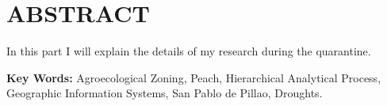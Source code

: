 \chapter*{ABSTRACT}

In this part I will explain the details of my research during the quarantine.


\textbf{Key Words:} Agroecological Zoning, Peach, Hierarchical Analytical Process, Geographic Information Systems, San Pablo de Pillao, Droughts.